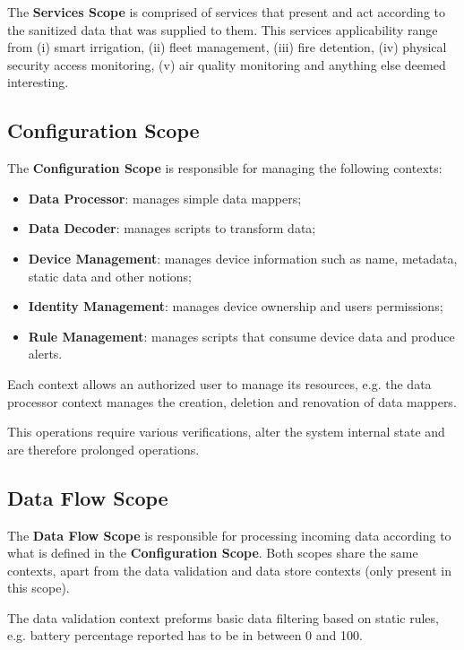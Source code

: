 The \textbf{Services Scope} is comprised of services that present and act according to the sanitized data that was supplied to them. This services applicability range from (i) smart irrigation, (ii) fleet management, (iii) fire detention, (iv) physical security access monitoring, (v) air quality monitoring and anything else deemed interesting.

\subsection{Configuration Scope}
\label{subsec:design:system_scopes:configuration_scope}

The \textbf{Configuration Scope} is responsible for managing the following contexts:

\begin{itemize}
   \item \textbf{Data Processor}: manages simple data mappers;
   \item \textbf{Data Decoder}: manages scripts to transform data;
   \item \textbf{Device Management}: manages device information such as name, metadata, static data and other notions;
   \item \textbf{Identity Management}: manages device ownership and users permissions;
   \item \textbf{Rule Management}: manages scripts that consume device data and produce alerts.
\end{itemize}

Each context allows an authorized user to manage its resources, e.g. the data processor context manages the creation, deletion and renovation of data mappers.

This operations require various verifications, alter the system internal state and are therefore prolonged operations.

\subsection{Data Flow Scope}
\label{subsec:design:system_scopes:data_flow_scope}

The \textbf{Data Flow Scope} is responsible for processing incoming data according to what is defined in the \textbf{Configuration Scope}. Both scopes share the same contexts, apart from the data validation and data store contexts (only present in this scope).

The data validation context preforms basic data filtering based on static rules, e.g. battery percentage reported has to be in between 0 and 100.

